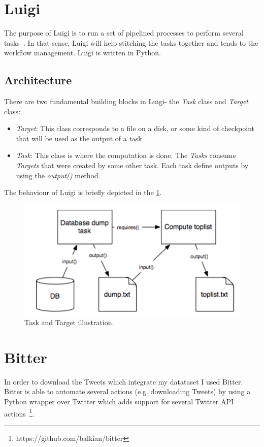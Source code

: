 \section{Luigi}
The purpose of Luigi is to run a set of pipelined processes to perform several tasks~\cite{luigi}. In that sense, Luigi will help stitching the tasks together and tends to the workflow management. Luigi is written in Python.\par
\subsection{Architecture}
There are two fundamental building blocks in Luigi- the \textit{Task} class and \textit{Target} class:
\begin{itemize}
	\item \textit{Target}: This class corresponds to a file on a disk, or some kind of checkpoint that will be used as the output of a task.
	\item \textit{Task}: This class is where the computation is done. The \textit{Tasks} consume \textit{Targets} that were created by some other task. Each task define outputs by using the \textit{output()} method. 
\end{itemize}
The behaviour of Luigi is briefly depicted in the \cref{fig:luigytask}.
\begin{figure}
	\includegraphics[width=\linewidth]{img/luigi_tasks.png}
	\caption{Task and Target illustration.~\cite{luigi}}
	\label{fig:luigytask}
\end{figure}
\section{Bitter}
In order to download the Tweets which integrate my datataset I used Bitter. Bitter is able to automate several actions (e.g. downloading Tweets) by using a Python wrapper over Twitter which adds support for several Twitter API actions~\footnote{https://github.com/balkian/bitter}.
